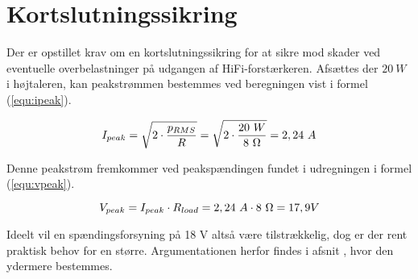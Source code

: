 \section{Kortslutningssikring}
\label{valg_kortslutningssikring}
Der er opstillet krav om en kortslutningssikring for at sikre mod skader ved eventuelle overbelastninger på udgangen af HiFi-forstærkeren. Afsættes der $20~W$ i højtaleren, kan peakstrømmen bestemmes ved beregningen vist i formel (\ref{equ:ipeak}).

\begin{equation}
\label{equ:ipeak}
I_{peak} = \sqrt{2 \cdot \frac{p_{RMS}}{R}} = \sqrt{2 \cdot \frac{20~W}{8~\ohm}}  = 2,24~A
\end{equation}

Denne peakstrøm fremkommer ved peakspændingen fundet i udregningen i formel (\ref{equ:vpeak}).

\begin{equation}
\label{equ:vpeak}
V_{peak} = I_{peak} \cdot R_{load} = 2,24~A \cdot 8~\ohm = 17,9 V
\end{equation}

Ideelt vil en spændingsforsyning på 18 V altså være tilstrækkelig, dog er der rent praktisk behov for en større. Argumentationen herfor findes i afsnit , hvor den ydermere bestemmes.